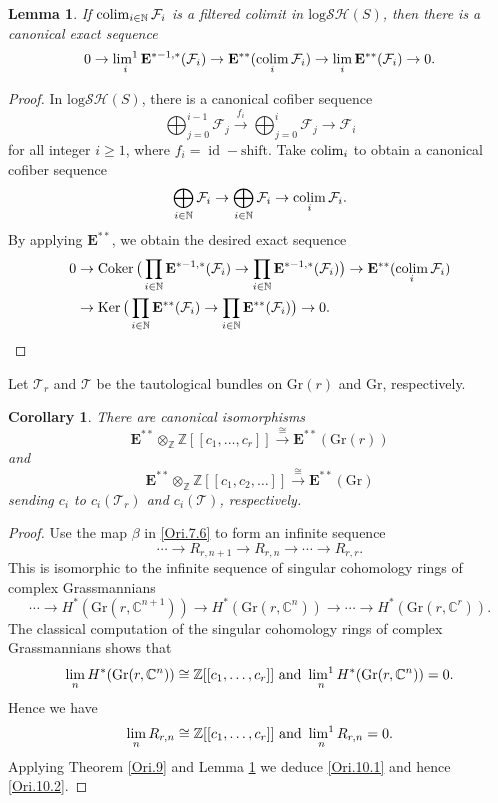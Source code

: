 \documentclass[11pt, a4paper]{amsart}
\newtheorem{lem}[thm]{Lemma}
\newtheorem{cor}[thm]{Corollary}
\theoremstyle{definition}
\numberwithin{equation}{subsection}
\newcommand{\N}{\mathbb{N}}
\newcommand{\Z}{\mathbb{Z}}
\newcommand{\C}{\mathbb{C}}
\newcommand{\id}{\operatorname{id}}   			%
\newcommand{\coker}{\operatorname{Coker}}			 %
\renewcommand{\ker}{\operatorname{Ker}}				 %
\newcommand{\colimit}{\mathop{\rm colim}}
\newcommand{\limit}{\mathop{\rm lim}}
\newcommand{\limitone}{\mathop{\rm lim^1}}
\newcommand{\Gr}{{\mathrm{Gr}}}
\newcommand{\cF}{\mathcal{F}}
\newcommand{\cT}{\mathcal{T}}
\newcommand{\ringE}{\mathbf{E}}
\newcommand{\inflogSH}{\mathrm{log}\mathcal{SH}}
\begin{document}
\begin{lem}
\label{Ori.32}
If $\colimit_{i\in \N} \cF_i$ is a filtered colimit in $\inflogSH(S)$, then there is a canonical exact sequence
\[
0
\to
\limitone_{i} \ringE^{*-1,*}(\cF_i)
\to
\ringE^{**}(\colimit_i \cF_i)
\to
\limit_i \ringE^{**}(\cF_i)
\to
0.
\]
\end{lem}
\begin{proof}
In $\inflogSH(S)$,
there is a canonical cofiber sequence
\[
\bigoplus_{j=0}^{i-1} \cF_j
\xrightarrow{f_i}
\bigoplus_{j=0}^i \cF_j
\to
\cF_i
\]
for all integer $i\geq 1$,
where $f_i=\id-\mathrm{shift}$.
Take $\colimit_i$ to obtain a canonical cofiber sequence
\[
\bigoplus_{i\in \N} \cF_i
\to
\bigoplus_{i\in \N} \cF_i
\to
\colimit_{i} \cF_i.
\]
By applying $\ringE^{**}$, we obtain the desired exact sequence
\begin{align*}
0
&\to
\coker\big(\prod_{i\in \N} \ringE^{*-1,*}(\cF_i) \to \prod_{i\in \N} \ringE^{*-1,*}(\cF_i)\big)
\to
\ringE^{**}(\colimit_i \cF_i)
\\
&\to
\ker \big(\prod_{i\in \N} \ringE^{**}(\cF_i) \to \prod_{i\in \N} \ringE^{**}(\cF_i)\big)
\to
0.
\end{align*}
\end{proof}

Let $\cT_r$ and $\cT$ be the tautological bundles on $\Gr(r)$ and $\Gr$, 
respectively.

\begin{cor}
\label{Ori.10}
There are canonical isomorphisms
\begin{equation}
\label{Ori.10.1}
\ringE^{**}\otimes_{\Z} \Z[[c_1,\ldots,c_r]]
\xrightarrow{\cong}
\ringE^{**}(\Gr(r))
\end{equation}
and
\begin{equation}
\label{Ori.10.2}
\ringE^{**}\otimes_{\Z} \Z[[c_1,c_2,\ldots]]
\xrightarrow{\cong}
\ringE^{**}(\Gr)
\end{equation}
sending $c_i$ to $c_i(\cT_r)$ and $c_i(\cT)$, 
respectively.
\end{cor}
\begin{proof}
Use the map $\beta$ in \eqref{Ori.7.6} to form an infinite sequence
\[
\cdots \to R_{r,n+1}\to R_{r,n}\to \cdots \to R_{r,r}.
\]
This is isomorphic to the infinite sequence of singular cohomology rings of complex Grassmannians
\[
\cdots \to H^*(\Gr(r,\C^{n+1}))\to H^*(\Gr(r,\C^{n}))\to \cdots \to H^*(\Gr(r,\C^{r})).
\]
The classical computation of the singular cohomology rings of complex Grassmannians shows that 
\[
\limit_n H^*(\Gr(r,\C^n)) \cong \Z[[c_1,\ldots,c_r]]
\text{ and }
\limitone_n H^*(\Gr(r,\C^n))=0.
\]
Hence we have
\begin{equation}
\label{Ori.10.3}
\limit_n R_{r,n} \cong \Z[[c_1,\ldots,c_r]]
\text{ and }
\limitone_n R_{r,n}=0.
\end{equation}
Applying Theorem \ref{Ori.9} and Lemma \ref{Ori.32} we deduce \eqref{Ori.10.1} 
and hence \eqref{Ori.10.2}.
\end{proof}
\end{document}
